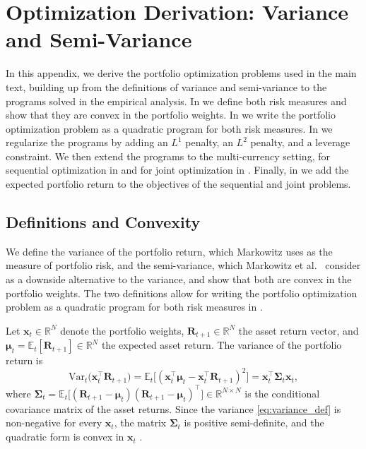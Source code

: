 \chapter{Optimization Derivation: Variance and Semi-Variance} \label{app:mv_derivation}

In this appendix, we derive the portfolio optimization problems used in the main text, building up from the definitions
of variance and semi-variance to the programs solved in the empirical analysis. In  we define
both risk measures and show that they are convex in the portfolio weights. In  we write the
portfolio optimization problem as a quadratic program for both risk measures. In  we
regularize the programs by adding an $L^1$ penalty, an $L^2$ penalty, and a leverage constraint. We then extend the
programs to the multi-currency setting, for sequential optimization in  and for joint
optimization in . Finally, in  we add the expected portfolio return to the
objectives of the sequential and joint problems.





\section{Definitions and Convexity} \label{app:mv_definitions}

We define the variance of the portfolio return, which Markowitz \cite{Markowitz1952} uses as the measure of portfolio
risk, and the semi-variance, which Markowitz et al.~\cite{Markowitz1993} consider as a downside alternative to the
variance, and show that both are convex in the portfolio weights. The two definitions allow for writing the portfolio
optimization problem as a quadratic program for both risk measures in .

Let $\bm{x}_t \in \mathbb{R}^N$ denote the portfolio weights, $\bm{R}_{t+1} \in \mathbb{R}^N$ the asset return vector,
and $\bm{\mu}_t = \mathbb{E}_t[\bm{R}_{t+1}] \in \mathbb{R}^N$ the expected asset return. The variance of the
portfolio return is
\begin{equation} \label{eq:variance_def}
    \text{Var}_t\bigl( \bm{x}_t^\top \bm{R}_{t+1} \bigr)
    = \mathbb{E}_t\bigl[ (\bm{x}_t^\top \bm{\mu}_t - \bm{x}_t^\top \bm{R}_{t+1})^2 \bigr]
    = \bm{x}_t^\top \bm{\Sigma}_t \bm{x}_t,
\end{equation}
where $\bm{\Sigma}_t = \mathbb{E}_t\bigl[ (\bm{R}_{t+1} - \bm{\mu}_t)(\bm{R}_{t+1} - \bm{\mu}_t)^\top \bigr]
\in \mathbb{R}^{N \times N}$ is the conditional covariance matrix of the asset returns. Since the variance \eqref{eq:variance_def} is non-negative for every $\bm{x}_t$, the matrix
$\bm{\Sigma}_t$ is positive semi-definite, and the quadratic form is convex in $\bm{x}_t$
\cite[Section~3.1.4]{boyd2004convex}. 

